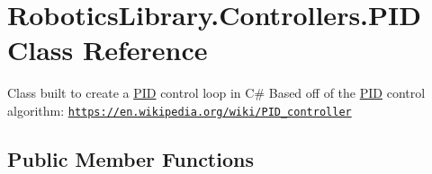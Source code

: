 \hypertarget{class_robotics_library_1_1_controllers_1_1_p_i_d}{}\section{Robotics\+Library.\+Controllers.\+P\+ID Class Reference}
\label{class_robotics_library_1_1_controllers_1_1_p_i_d}


Class built to create a \hyperlink{class_robotics_library_1_1_controllers_1_1_p_i_d}{P\+ID} control loop in C\# Based off of the \hyperlink{class_robotics_library_1_1_controllers_1_1_p_i_d}{P\+ID} control algorithm\+: \href{https://en.wikipedia.org/wiki/PID_controller}{\tt https\+://en.\+wikipedia.\+org/wiki/\+P\+I\+D\+\_\+controller}  


\subsection*{Public Member Functions}
